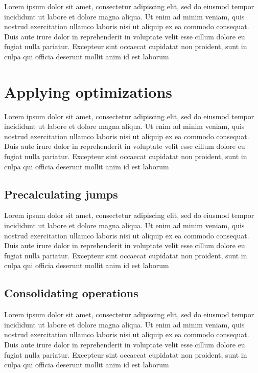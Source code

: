 \par Lorem ipsum dolor sit amet, consectetur adipiscing elit, sed do eiusmod tempor incididunt ut labore et dolore magna aliqua. Ut enim ad minim veniam, quis nostrud exercitation ullamco laboris nisi ut aliquip ex ea commodo consequat. Duis aute irure dolor in reprehenderit in voluptate velit esse cillum dolore eu fugiat nulla pariatur. Excepteur sint occaecat cupidatat non proident, sunt in culpa qui officia deserunt mollit anim id est laborum

\section{Applying optimizations}
\label{sec:ch2sec3}

\par Lorem ipsum dolor sit amet, consectetur adipiscing elit, sed do eiusmod tempor incididunt ut labore et dolore magna aliqua. Ut enim ad minim veniam, quis nostrud exercitation ullamco laboris nisi ut aliquip ex ea commodo consequat. Duis aute irure dolor in reprehenderit in voluptate velit esse cillum dolore eu fugiat nulla pariatur. Excepteur sint occaecat cupidatat non proident, sunt in culpa qui officia deserunt mollit anim id est laborum

\subsection{Precalculating jumps}
\label{subsec:ch2sec3sec1}

\par Lorem ipsum dolor sit amet, consectetur adipiscing elit, sed do eiusmod tempor incididunt ut labore et dolore magna aliqua. Ut enim ad minim veniam, quis nostrud exercitation ullamco laboris nisi ut aliquip ex ea commodo consequat. Duis aute irure dolor in reprehenderit in voluptate velit esse cillum dolore eu fugiat nulla pariatur. Excepteur sint occaecat cupidatat non proident, sunt in culpa qui officia deserunt mollit anim id est laborum

\subsection{Consolidating operations}
\label{subsec:ch2sec3sec2}

\par Lorem ipsum dolor sit amet, consectetur adipiscing elit, sed do eiusmod tempor incididunt ut labore et dolore magna aliqua. Ut enim ad minim veniam, quis nostrud exercitation ullamco laboris nisi ut aliquip ex ea commodo consequat. Duis aute irure dolor in reprehenderit in voluptate velit esse cillum dolore eu fugiat nulla pariatur. Excepteur sint occaecat cupidatat non proident, sunt in culpa qui officia deserunt mollit anim id est laborum

